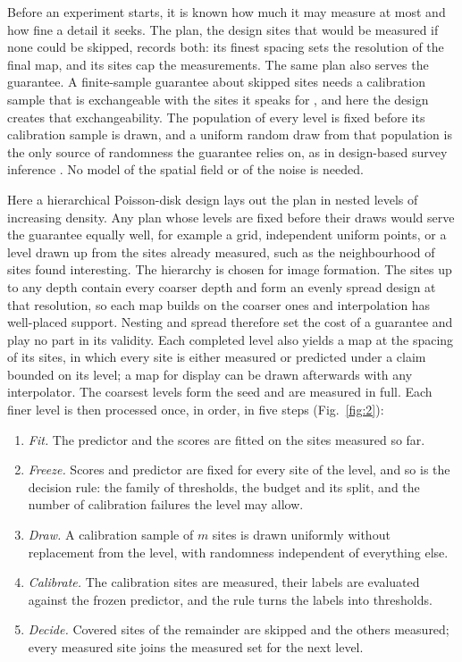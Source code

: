 \documentclass{iopjournal}
\providecommand{\tightlist}{\setlength{\itemsep}{0pt}\setlength{\parskip}{0pt}}
\begin{document}
Before an experiment starts, it is known how much it may measure at most and how fine a detail it seeks. The plan, the design sites that would be measured if none could be skipped, records both: its finest spacing sets the resolution of the final map, and its sites cap the measurements. The same plan also serves the guarantee. A finite-sample guarantee about skipped sites needs a calibration sample that is exchangeable with the sites it speaks for \cite{Vovk2005}, and here the design creates that exchangeability. The population of every level is fixed before its calibration sample is drawn, and a uniform random draw from that population is the only source of randomness the guarantee relies on, as in design-based survey inference \cite{Neyman1934,Cochran1977}. No model of the spatial field or of the noise is needed.

Here a hierarchical Poisson-disk design \cite{Bridson2007} lays out the plan in nested levels of increasing density. Any plan whose levels are fixed before their draws would serve the guarantee equally well, for example a grid, independent uniform points, or a level drawn up from the sites already measured, such as the neighbourhood of sites found interesting. The hierarchy is chosen for image formation. The sites up to any depth contain every coarser depth and form an evenly spread design at that resolution, so each map builds on the coarser ones and interpolation has well-placed support. Nesting and spread therefore set the cost of a guarantee and play no part in its validity. Each completed level also yields a map at the spacing of its sites, in which every site is either measured or predicted under a claim bounded on its level; a map for display can be drawn afterwards with any interpolator. The coarsest levels form the seed and are measured in full. Each finer level is then processed once, in order, in five steps (Fig.~\ref{fig:2}):

\begin{enumerate}
\def\labelenumi{\arabic{enumi}.}
\tightlist
\item
  \emph{Fit.} The predictor and the scores are fitted on the sites measured so far.
\item
  \emph{Freeze.} Scores and predictor are fixed for every site of the level, and so is the decision rule: the family of thresholds, the budget and its split, and the number of calibration failures the level may allow.
\item
  \emph{Draw.} A calibration sample of \(m\) sites is drawn uniformly without replacement from the level, with randomness independent of everything else.
\item
  \emph{Calibrate.} The calibration sites are measured, their labels are evaluated against the frozen predictor, and the rule turns the labels into thresholds.
\item
  \emph{Decide.} Covered sites of the remainder are skipped and the others measured; every measured site joins the measured set for the next level.
\end{enumerate}
\end{document}
